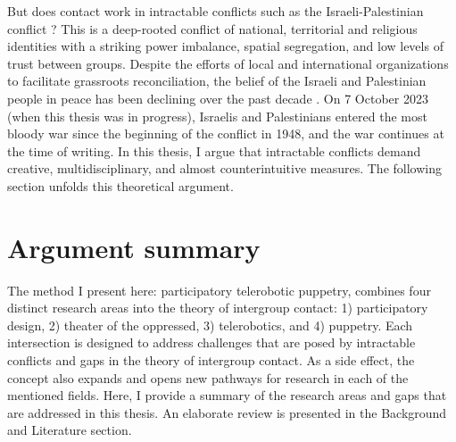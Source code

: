 \documentclass[dissertation,math,vertlayout,pdfa,colorlinks]{aaltoseries}
\begin{document}
But does contact work in intractable conflicts such as the Israeli-Palestinian conflict \cite{bar-talIntractableConflictsSociopsychological2013,maozDoesContactWork2011}? This is a deep-rooted conflict of national, territorial and religious identities with a striking power imbalance, spatial segregation, and low levels of trust between groups. Despite the efforts of local and international organizations to facilitate grassroots reconciliation, the belief of the Israeli and Palestinian people in peace has been declining over the past decade \cite{cavatortaAnalysisChangingIsraeli2024,haslerYoungGenerationsHopelessness2023}. On 7 October 2023 (when this thesis was in progress), Israelis and Palestinians entered the most bloody war since the beginning of the conflict in 1948, and the war continues at the time of writing. In this thesis, I argue that intractable conflicts demand creative, multidisciplinary, and almost counterintuitive measures. The following section unfolds this theoretical argument.

\section{Argument summary}
The method I present here: participatory telerobotic puppetry, combines four distinct research areas into the theory of intergroup contact: 1) participatory design, 2) theater of the oppressed, 3) telerobotics, and 4) puppetry. Each intersection is designed to address challenges that are posed by intractable conflicts and gaps in the theory of intergroup contact. As a side effect, the concept also expands and opens new pathways for research in each of the mentioned fields. Here, I provide a summary of the research areas and gaps that are addressed in this thesis. An elaborate review is presented in the Background and Literature section.
\end{document}

